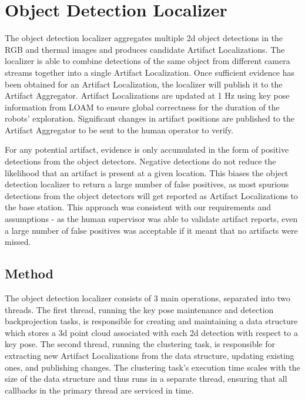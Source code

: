 \section{Object Detection Localizer}

The object detection localizer aggregates multiple 2d object detections in the RGB and thermal images and produces candidate Artifact Localizations. The localizer is able to combine detections of the same object from different camera streams together into a single Artifact Localization. Once sufficient evidence has been obtained for an Artifact Localization, the localizer will publish it to the Artifact Aggregator. Artifact Localizations are updated at 1 Hz using key pose information from LOAM to ensure global correctness for the duration of the robots' exploration. Significant changes in artifact positions are published to the Artifact Aggregator to be sent to the human operator to verify.

For any potential artifact, evidence is only accumulated in the form of positive detections from the object detectors. Negative detections do not reduce the likelihood that an artifact is present at a given location. This biases the object detection localizer to return a large number of false positives, as most spurious detections from the object detectors will get reported as Artifact Localizations to the base station. This approach was consistent with our requirements and assumptions - as the human supervisor was able to validate artifact reports, even a large number of false positives was acceptable if it meant that no artifacts were missed.

\subsection{Method}

The object detection localizer consists of 3 main operations, separated into two threads. The first thread, running the key pose maintenance and detection backprojection tasks, is responsible for creating and maintaining a data structure which stores a 3d point cloud associated with each 2d detection with respect to a key pose. The second thread, running the clustering task, is responsible for extracting new Artifact Localizations from the data structure, updating existing ones, and publishing changes. The clustering task's execution time scales with the size of the data structure and thus runs in a separate thread, ensuring that all callbacks in the primary thread are serviced in time.

